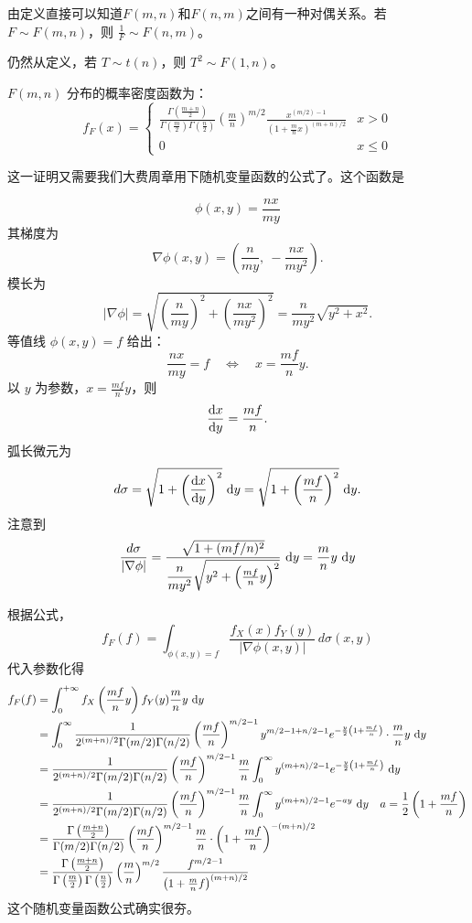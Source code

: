 由定义直接可以知道$F(m,n)$和$F(n,m)$之间有一种对偶关系。若 $F \sim F(m, n)$，则 $\frac{1}{F} \sim F(n, m)$。

仍然从定义，若 $T \sim t(n)$，则 $T^2 \sim F(1, n)$。

$F(m, n)$ 分布的概率密度函数为：
\[
f_F(x) = \begin{cases}
\frac{\Gamma\left(\frac{m+n}{2}\right)}{\Gamma\left(\frac{m}{2}\right) \Gamma\left(\frac{n}{2}\right)}
\left(\frac{m}{n}\right)^{m/2}
\frac{x^{(m/2)-1}}{\left(1 + \frac{m}{n}x\right)^{(m+n)/2}} &x > 0\\
0 & x \leq 0
\end{cases}
\]

这一证明又需要我们大费周章用下随机变量函数的公式了。这个函数是

\[
\phi(x,y) = \frac{nx}{my}
\]
其梯度为
\[
\nabla \phi(x,y) = \left( \frac{n}{my},\ -\frac{nx}{my^2} \right).
\]
模长为
\[
|\nabla \phi| = \sqrt{ \left( \frac{n}{my} \right)^2 + \left( \frac{nx}{my^2} \right)^2 }
              = \frac{n}{my^2} \sqrt{ y^2 + x^2 }.
\]
等值线 $\phi(x,y) = f$ 给出：
\[
\frac{nx}{my} = f \quad\iff\quad x = \frac{mf}{n} y.
\]
以 $y$ 为参数，$x = \frac{mf}{n} y$，则
\[
\frac{\mathop{}\!\mathrm{d} x}{\mathop{}\!\mathrm{d} y} = \frac{mf}{n}.
\]
弧长微元为
\[
d\sigma = \sqrt{1 + \left( \frac{\mathop{}\!\mathrm{d} x}{\mathop{}\!\mathrm{d} y} \right)^2} \, \mathop{}\!\mathrm{d} y
         = \sqrt{1 + \left( \frac{mf}{n} \right)^2} \, \mathop{}\!\mathrm{d} y.
\]
注意到
\[
\frac{d\sigma}{|\nabla \phi|} = 
\frac{\sqrt{1 + (mf/n)^2}}{ \dfrac{n}{my^2} \sqrt{ y^2 + \left( \frac{mf}{n} y \right)^2 } } \, \mathop{}\!\mathrm{d} y= \frac{m}{n} y \, \mathop{}\!\mathrm{d} y
\]

根据公式，
\[
f_F(f) = \int_{\phi(x,y)=f} \frac{f_X(x) f_Y(y)}{|\nabla \phi(x,y)|} \, d\sigma(x,y)
\]
代入参数化得
\begin{align*}
f_F(f) &= \int_{0}^{+\infty} f_X\left(\frac{mf}{n} y\right) f_Y(y)\frac{m}{n} y\, \mathop{}\!\mathrm{d} y\\
&= \int_{0}^{\infty} \frac{1}{2^{(m+n)/2} \Gamma(m/2) \Gamma(n/2)}
    \left( \frac{mf}{n} \right)^{m/2 - 1} y^{m/2 - 1 + n/2 - 1}
    e^{ -\frac{y}{2}\left(1 + \frac{mf}{n}\right) }
    \cdot \frac{m}{n} y \, \mathop{}\!\mathrm{d} y\\
&= \frac{1}{2^{(m+n)/2} \Gamma(m/2) \Gamma(n/2)}
    \left( \frac{mf}{n} \right)^{m/2 - 1} \frac{m}{n}
    \int_{0}^{\infty} y^{(m+n)/2 - 1}
    e^{ -\frac{y}{2}\left(1 + \frac{mf}{n}\right) } \, \mathop{}\!\mathrm{d} y\\
&=\frac{1}{2^{(m+n)/2} \Gamma(m/2) \Gamma(n/2)}
    \left( \frac{mf}{n} \right)^{m/2 - 1} \frac{m}{n} \int_{0}^{\infty} y^{(m+n)/2 - 1} e^{-a y} \, \mathop{}\!\mathrm{d} y \quad a=\frac{1}{2}\left(1 + \frac{mf}{n}\right)\\
&= \frac{ \Gamma\left(\frac{m+n}{2}\right) }{ \Gamma(m/2) \Gamma(n/2) }
    \left( \frac{mf}{n} \right)^{m/2 - 1} \frac{m}{n}
    \cdot \left(1 + \frac{mf}{n}\right) ^{-(m+n)/2}  \\
&= \frac{\Gamma\left(\frac{m+n}{2}\right)}{\Gamma\left(\frac{m}{2}\right) \Gamma\left(\frac{n}{2}\right)}
\left( \frac{m}{n} \right)^{m/2}
\frac{f^{m/2 - 1}}{\left(1 + \frac{m}{n} f \right)^{(m+n)/2}}
\end{align*}
这个随机变量函数公式确实很夯。


